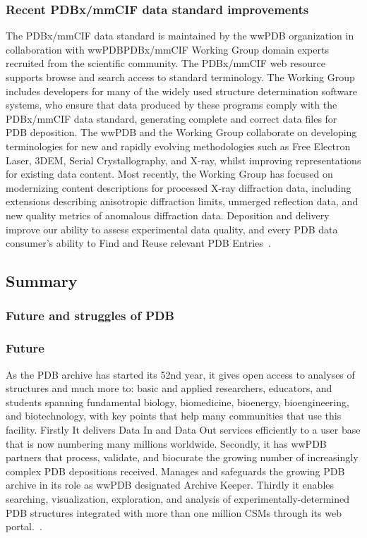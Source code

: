 \documentclass{report}
\begin{document}
\subsubsection*{Recent PDBx/mmCIF data standard improvements}

The PDBx/mmCIF data standard is maintained by the wwPDB organization in collaboration with wwPDBPDBx/mmCIF Working Group domain experts recruited from the scientific community. The PDBx/mmCIF web resource supports browse and search access to standard terminology. The Working Group includes developers for many of the widely used structure determination software systems, who ensure that data produced by these programs comply with the PDBx/mmCIF data standard, generating complete and correct data files for PDB deposition. The wwPDB and the Working Group collaborate on developing terminologies for new and rapidly evolving methodologies such as Free Electron Laser, 3DEM, Serial Crystallography, and X-ray, whilst improving representations for existing data content. Most recently, the Working Group has focused on modernizing content descriptions for processed X-ray diffraction data, including extensions describing anisotropic diffraction limits, unmerged reflection data, and new quality metrics of anomalous diffraction data. Deposition and delivery improve our ability to assess experimental data quality, and every PDB data consumer's ability to Find and Reuse relevant PDB Entries~\cite{burley_rcsb_2022}.

\subsection{Summary}
\subsubsection{Future and struggles of PDB}
\subsubsection{Future}
As the PDB archive has started its 52nd year, it gives open access to analyses of structures and much more to: basic and applied researchers, educators, and students spanning fundamental biology, biomedicine, bioenergy, bioengineering, and biotechnology, with key points that help many communities that use this facility. Firstly It delivers Data In and Data Out services efficiently to a user base that is now numbering many millions worldwide. Secondly, it has wwPDB partners that process, validate, and biocurate the growing number of increasingly complex PDB depositions received. Manages and safeguards the growing PDB archive in its role as wwPDB designated Archive Keeper. Thirdly it enables searching, visualization, exploration, and analysis of experimentally-determined PDB structures integrated with more than one million CSMs through its web portal.~\cite{burley1_rcsb_2022}.
\end{document}
